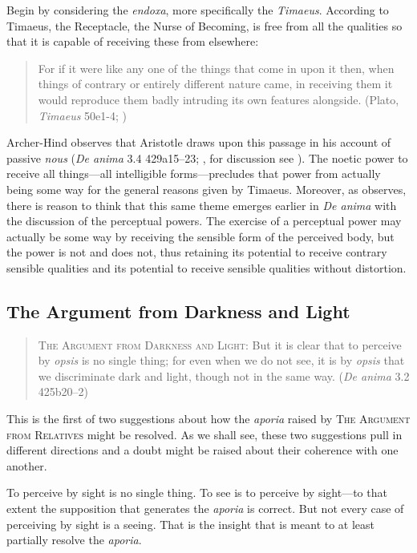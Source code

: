Begin by considering the \emph{endoxa}, more specifically the \emph{Timaeus}. According to Timaeus, the Receptacle, the Nurse of Becoming, is free from all the qualities so that it is capable of receiving these from elsewhere:
\begin{quote}
	For if it were like any one of the things that come in upon it then, when things of contrary or entirely different nature came, in receiving them it would reproduce them badly intruding its own features alongside. (Plato, \emph{Timaeus} 50e1-4; \citealt[186]{Cornford:1935fk})
\end{quote}
Archer-Hind observes that Aristotle draws upon this passage in his account of passive \emph{nous} (\emph{De anima} 3.4 429a15–23; \citealt[177 n18]{Archer-Hind:1888qd}, for discussion see \citealt[327–8]{Taylor:1928qb}). The noetic power to receive all things—all intelligible forms—precludes that power from actually being some way for the general reasons given by Timaeus. Moreover, as \citet[327–8]{Taylor:1928qb} observes, there is reason to think that this same theme emerges earlier in \emph{De anima} with the discussion of the perceptual powers. The exercise of a perceptual power may actually be some way by receiving the sensible form of the perceived body, but the power is not and does not, thus retaining its potential to receive contrary sensible qualities and its potential to receive sensible qualities without distortion.


\subsection{The Argument from Darkness and Light} %
\label{sub:the_argument_from_darkness}

\begin{quote}
	\textsc{The Argument from Darkness and Light}: But it is clear that to perceive by \emph{opsis} is no single thing; for even when we do not see, it is by \emph{opsis} that we discriminate dark and light, though not in the same way. (\emph{De anima} 3.2 425b20–2)
\end{quote}

This is the first of two suggestions about how the \emph{aporia} raised by \textsc{The Argument from Relatives} might be resolved. As we shall see, these two suggestions pull in different directions and a doubt might be raised about their coherence with one another.

To perceive by sight is no single thing. To see is to perceive by sight—to that extent the supposition that generates the \emph{aporia} is correct. But not every case of perceiving by sight is a seeing. That is the insight that is meant to at least partially resolve the \emph{aporia}.


